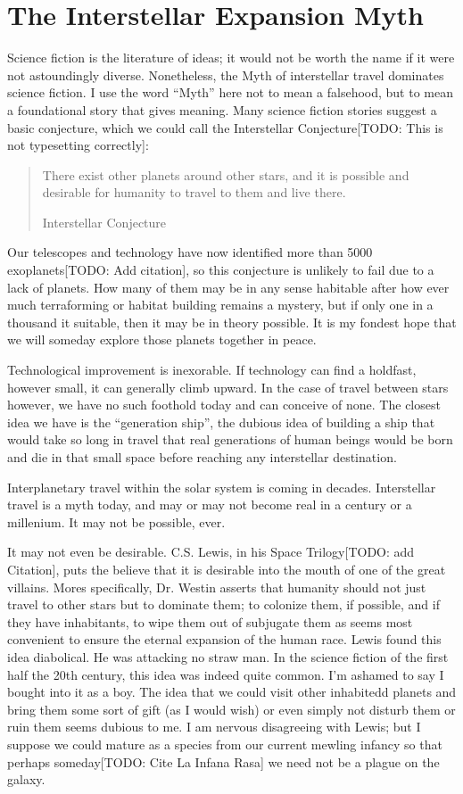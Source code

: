\documentclass[
	fontsize=10pt, %
	twoside=false, %
	secnumdepth=1, %
]{kaobook}
\begin{document}
\section{The Interstellar Expansion Myth}

Science fiction is the literature of ideas; it would not be worth the name if it were not astoundingly diverse.
Nonetheless, the Myth of interstellar travel dominates science fiction.
I use the word ``Myth'' here not to mean a falsehood, but to mean a foundational story that gives meaning.
Many science fiction stories suggest a basic conjecture, which we could call the Interstellar Conjecture[TODO: This is not typesetting correctly]:

\blockquote[Interstellar Conjecture]{
  There exist other planets around other stars, and it is possible and desirable for humanity to travel to them and live there.
}

Our telescopes and technology have now identified more than 5000 exoplanets[TODO: Add citation], so this
conjecture is unlikely to fail due to a lack of planets. How many of them may
be in any sense habitable after how ever much terraforming or habitat building
remains a mystery, but if only one in a thousand it suitable, then it may
be in theory possible.
It is my fondest hope that we will someday explore those planets together in peace.

Technological improvement is inexorable. If technology can find a holdfast, however small,
it can generally climb upward. In the case of travel between stars however, we have no
such foothold today and can conceive of none. The closest idea we have is the ``generation ship'',
the dubious idea of building a ship that would take so long in travel that real generations of
human beings would be born and die in that small space before reaching any interstellar
destination.

Interplanetary travel within the solar system is coming in decades.
Interstellar travel is a myth today,
and may or may not become real in a century or a millenium. It may not be possible, ever.

It may not even be desirable. C.S. Lewis, in his Space Trilogy[TODO: add Citation], puts the believe that
it is desirable into the mouth of one of the great villains.
Mores specifically,
Dr. Westin asserts that humanity should not just travel to other stars but to dominate them;
to colonize them,
if possible, and if they have inhabitants, to wipe them out of subjugate them as seems most convenient
to ensure the eternal expansion of the human race.
Lewis found this idea diabolical.
He was attacking no straw man. In the science fiction of the first half the 20th century, this
idea was indeed quite common. I'm ashamed to say I bought into it as a boy.
The idea that we could visit other inhabitedd planets and bring them some sort of gift (as I would wish)
or even simply not disturb them or ruin them seems dubious to me.
I am nervous disagreeing with Lewis;
but I suppose we could mature as a species from our current mewling infancy so that perhaps someday[TODO: Cite La Infana Rasa]
we need not be a plague on the galaxy.
\end{document}
